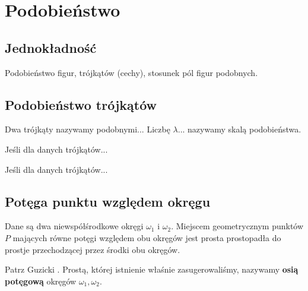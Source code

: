 %

\section{Podobieństwo}
\subsection{Jednokładność}
Podobieństwo figur, trójkątów (cechy), stosunek pól figur podobnych.



\subsection{Podobieństwo trójkątów}

\begin{definition}
	Dwa trójkąty nazywamy podobnymi...
	Liczbę $\lambda$... nazywamy skalą podobieństwa.
\end{definition}

\begin{proposition}
	Jeśli dla danych trójkątów...
\end{proposition}

\begin{proposition}
	Jeśli dla danych trójkątów...
\end{proposition}




\subsection{Potęga punktu względem okręgu}

\begin{proposition}
\label{guzicki_6_11}%
    Dane są dwa niewspółśrodkowe okręgi $\omega_1$ i $\omega_2$.
    Miejscem geometrycznym punktów $P$ mających równe potęgi względem obu okręgów jest prosta prostopadła do prostje przechodzącej przez środki obu okręgów.
%
\end{proposition}

Patrz Guzicki \cite[s. 173, 174]{guzicki_2021}.
Prostą, której istnienie właśnie zasugerowaliśmy, nazywamy \textbf{osią potęgową} okręgów $\omega_1, \omega_2$.

